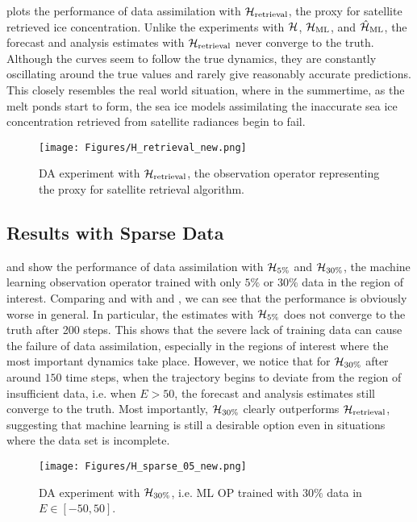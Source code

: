 \par {} plots the performance of data assimilation with $\mathcal{H}_{\text{retrieval}}$, the proxy for satellite retrieved ice concentration. Unlike the experiments with $\mathcal{H}$, $\mathcal{H}_{\text{ML}}$, and $\hat{\mathcal{H}}_{\text{ML}}$, the forecast and analysis estimates with $\mathcal{H}_{\text{retrieval}}$ never converge to the truth. Although the curves seem to follow the true dynamics, they are constantly oscillating around the true values and rarely give reasonably accurate predictions. This closely resembles the real world situation, where in the summertime, as the melt ponds start to form, the sea ice models assimilating the inaccurate sea ice concentration retrieved from satellite radiances begin to fail.

\begin{figure}\label{fig:hretrievalDA}
\begin{center}
\texttt{[image: Figures/H\_retrieval\_new.png]} 
\end{center}
\caption{DA experiment with $\mathcal{H}_{\text{retrieval}}$, the observation operator representing the proxy for satellite retrieval algorithm.}
\end{figure}

\subsection{Results with Sparse Data}

\par {} and  show the performance of data assimilation with $\mathcal{H}_{5\%}$ and $\mathcal{H}_{30\%}$, the machine learning observation operator trained with only $5\%$ or $30\%$ data in the region of interest. Comparing  and  with  and , we can see that the performance is obviously worse in general. In particular, the estimates with $\mathcal{H}_{5\%}$ does not converge to the truth after 200 steps. This shows that the severe lack of training data can cause the failure of data assimilation, especially in the regions of interest where the most important dynamics take place. However, we notice that for $\mathcal{H}_{30\%}$ after around $150$ time steps, when the trajectory begins to deviate from the region of insufficient data, i.e. when $E>50$, the forecast and analysis estimates still converge to the truth. Most importantly, $\mathcal{H}_{30\%}$ clearly outperforms $\mathcal{H}_{\text{retrieval}}$, suggesting that machine learning is still a desirable option even in situations where the data set is incomplete.

\begin{figure}\label{fig:h30pDA}
\begin{center}
\texttt{[image: Figures/H\_sparse\_05\_new.png]} 
\end{center}
\caption{DA experiment with $\mathcal{H}_{30\%}$, i.e. ML OP trained with $30\%$ data in $E\in[-50,50]$.}
\end{figure}

